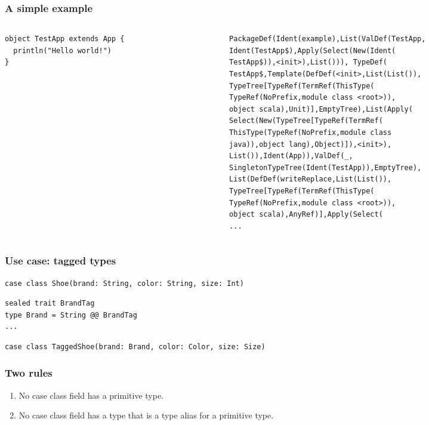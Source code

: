 \documentclass[aspectratio=169]{beamer}
\begin{document}
\begin{frame}[fragile]
\frametitle{A simple example}
\begin{columns}
\begin{column}{0.4\textwidth}
\begin{lstlisting}[style=myScalastyle,frame=none]
object TestApp extends App {
  println("Hello world!")
}
\end{lstlisting}
\end{column}
\pause
\begin{column}{0.6\textwidth}
  \begin{lstlisting}[style=myTerminal,frame=none]
PackageDef(Ident(example),List(ValDef(TestApp,
Ident(TestApp$),Apply(Select(New(Ident(
TestApp$)),<init>),List())), TypeDef(
TestApp$,Template(DefDef(<init>,List(List()),
TypeTree[TypeRef(TermRef(ThisType(
TypeRef(NoPrefix,module class <root>)),
object scala),Unit)],EmptyTree),List(Apply(
Select(New(TypeTree[TypeRef(TermRef(
ThisType(TypeRef(NoPrefix,module class
java)),object lang),Object)]),<init>),
List()),Ident(App)),ValDef(_,
SingletonTypeTree(Ident(TestApp)),EmptyTree),
List(DefDef(writeReplace,List(List()),
TypeTree[TypeRef(TermRef(ThisType(
TypeRef(NoPrefix,module class <root>)),
object scala),AnyRef)],Apply(Select(
...
\end{lstlisting}
\end{column}
\end{columns}

\end{frame}





\begin{frame}[fragile]
  \frametitle{Use case: tagged types}
  
  \begin{lstlisting}[style=myScalastyle,frame=none]
case class Shoe(brand: String, color: String, size: Int)
  \end{lstlisting}
  \pause
  \begin{lstlisting}[style=myScalastyle,frame=none]
sealed trait BrandTag
type Brand = String @@ BrandTag
...
  \end{lstlisting}
  \pause
    \begin{lstlisting}[style=myScalastyle,frame=none]
case class TaggedShoe(brand: Brand, color: Color, size: Size)
  \end{lstlisting}
\end{frame}

\begin{frame}
  \frametitle{Two rules}
  
  \begin{enumerate}
    \item No case class field has a primitive type.
    \item No case class field has a type that is a type alias for a primitive type.
  \end{enumerate}
\end{frame}
\end{document}

